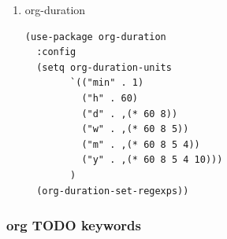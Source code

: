 \documentclass[11pt]{article}
\begin{document}
\begin{enumerate}
This is my version of the org-secretary
\begin{verbatim}
(use-package paf-secretary
  :load-path "~/Emacs"
  :bind (("\C-cw" . paf-sec-set-with)
         ("\C-cW" . paf-sec-set-where)
         ("\C-cj" . paf-sec-tag-entry))
  :config
  (setq paf-sec-me "paf")
  (setq org-tag-alist '(("PRJ" . ?p)
                        ("DESIGNDOC" . ?D)
                        ("Milestone" . ?m)
                        ("DESK" . ?d)
                        ("HOME" . ?h)
                        ("VC" . ?v))))
\end{verbatim}
\item org-duration
\label{sec:org8cdbf63}
\begin{verbatim}
(use-package org-duration
  :config
  (setq org-duration-units
        `(("min" . 1)
          ("h" . 60)
          ("d" . ,(* 60 8))
          ("w" . ,(* 60 8 5))
          ("m" . ,(* 60 8 5 4))
          ("y" . ,(* 60 8 5 4 10)))
        )
  (org-duration-set-regexps))
\end{verbatim}
\end{enumerate}
\subsubsection{org TODO keywords}
\label{sec:orgd8f0981}
\end{document}
